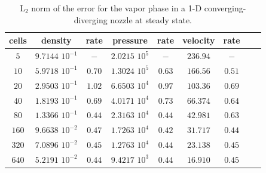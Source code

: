\documentclass[preprint,10pt]{elsarticle}
\newcommand{\tcr}[1]{\textcolor{red}{#1}}
\begin{document}

\begin{table}[H]
\begin{center}
 \caption{\label{tbl:l2_norm_vap} L$_2$ norm of the error for the vapor phase in a 1-D converging-diverging nozzle at steady state.}
 \begin{tabular}{|c|c|c|c|c|c|c|c|c|}
 \hline
cells & density             & rate      & pressure          & rate      & velocity & rate       \\ \hline
$5$   & $9.7144$ $10^{-1}$  & $-$       & $2.0215$ $10^{5}$ & $-$       & $236.94$ & $-$        \\ \hline
$10$  & $5.9718$ $10^{-1}$  & $0.70$ & $1.3024$ $10^{5}$ & $0.63$ & $166.56$ & $0.51$  \\ \hline
$20$  & $2.9503$ $10^{-1}$  & $1.02$  & $6.6503$ $10^{4}$ & $0.97$ & $103.36$ & $0.69$  \\ \hline
$40$  & $1.8193$ $10^{-1}$  & $0.69$ & $4.0171$ $10^{4}$ & $0.73$ & $66.374$ & $0.64$   \\ \hline
$80$  & $1.3366$ $10^{-1}$  & $0.44$ & $2.3163$ $10^{4}$ & $0.44$ & $42.981$ & $0.63$  \\ \hline
$160$ & $9.6638$ $10^{-2}$  & $0.47$ & $1.7263$ $10^{4}$ & $0.42$ & $31.717$ & $0.44$  \\ \hline
$320$ & $7.0896$ $10^{-2}$  & $0.45$ & $1.2763$ $10^{4}$ & $0.44$ & $23.138$ & $0.45$  \\ \hline
$640$ & $5.2191$ $10^{-2}$  & $0.44$ & $9.4217$ $10^{3}$ & $0.44$ & $16.910$ & $0.45$  \\ \hline
\end{tabular}
\end{center}
\nonumber
\end{table}
\end{document}
